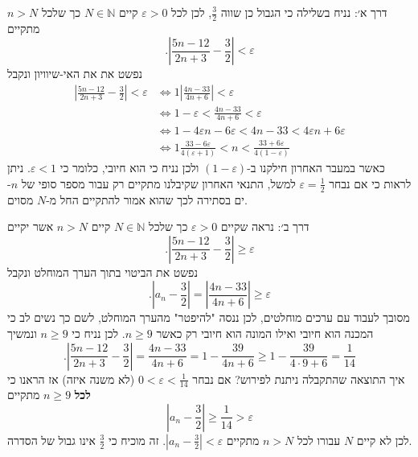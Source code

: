 \begin{enumerate}
\begin{solbox}
     דרך א׳: נניח בשלילה כי הגבול כן שווה
     $\frac{3}{2}$,
     לכן
לכל
$\varepsilon>0$
קיים
$N\in\mathbb{N}$
כך שלכל
$n>N$
מתקיים
$$.\left|\frac{5n-12}{2n+3}-\frac{3}{2}\right|<\varepsilon$$
נפשט את את האי-שיוויון ונקבל
\begin{align*}
\left|\frac{5n-12}{2n+3}-\frac{3}{2}\right|<\varepsilon
&\iff{1}
\left|\frac{4n-33}{4n+6}\right|<\varepsilon
\\&\iff{1}
-\varepsilon<\frac{4n-33}{4n+6}<\varepsilon
\\&\iff{1}
-4\varepsilon n-6\varepsilon< 4n-33< 4\varepsilon n+6\varepsilon
\\&\iff{1}
\frac{33-6\varepsilon}{4(\varepsilon+1)}< n<\frac{33+6\varepsilon}{4(1-\varepsilon)}
\end{align*}
כאשר במעבר האחרון חילקנו ב-$(1-\varepsilon)$
ולכן נניח כי הוא חיובי, כלומר כי
$\varepsilon<1$.
ניתן לראות כי אם נבחר
$\varepsilon=\frac12$
למשל, התנאי האחרון שקיבלנו מתקיים רק עבור מספר סופי של
$n$-ים
בסתירה לכך שהוא אמור להתקיים החל
מ-$N$
מסוים.
\end{solbox}

\begin{solbox}
דרך ב׳:
נראה שקיים
$\varepsilon>0$
כך שלכל
$N\in\mathbb{N}$
קיים
$n>N$
אשר יקיים
$$.\left|\frac{5n-12}{2n+3}-\frac{3}{2}\right|\geq\varepsilon$$
נפשט את הביטוי בתוך הערך המוחלט ונקבל
$$.\left| a_n-\frac{3}{2}\right|=\left|\frac{4n-33}{4n+6}\right|\geq\varepsilon$$
מסובך לעבוד עם ערכים מוחלטים, לכן ננסה "להיפטר" מהערך המוחלט, לשם כך נשים לב כי המכנה הוא חיובי ואילו המונה הוא חיובי רק כאשר
$n\geq 9$.
לכן נניח כי
$n\geq 9$
ונמשיך
$$.\left|\frac{5n-12}{2n+3}-\frac{3}{2}\right|=\frac{4n-33}{4n+6}=1-\frac{39}{4n+6}\geq 1-\frac{39}{4\cdot 9+6}=\frac{1}{14}$$
איך התוצאה שהתקבלה ניתנת לפירוש?
אם נבחר
$0<\varepsilon<\frac{1}{14}$
(לא משנה איזה)
אז הראנו כי \textbf{לכל}
$n\ge9$
מתקיים
$$\left|a_n-\frac{3}{2}\right|\geq\frac{1}{14}>\varepsilon$$
לכן לא קיים
$N$
עבורו לכל
$n>N$
מתקיים
$|a_n-\frac{3}{2}|<\varepsilon$.
זה מוכיח כי
$\frac{3}{2}$
אינו גבול של הסדרה.
\end{solbox}
\eMs
\end{enumerate}
